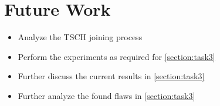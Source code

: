 \documentclass[conference]{IEEEtran}
\begin{document}





\section{Future Work}

\label{section:futurework}
\begin{itemize}
\item Analyze the TSCH joining process
\item Perform the experiments as required for \ref{section:task3}
\item Further discuss the current results in \ref{section:task3}
\item Further analyze the found flaws in \ref{section:task3}
\end{itemize}
\end{document}
